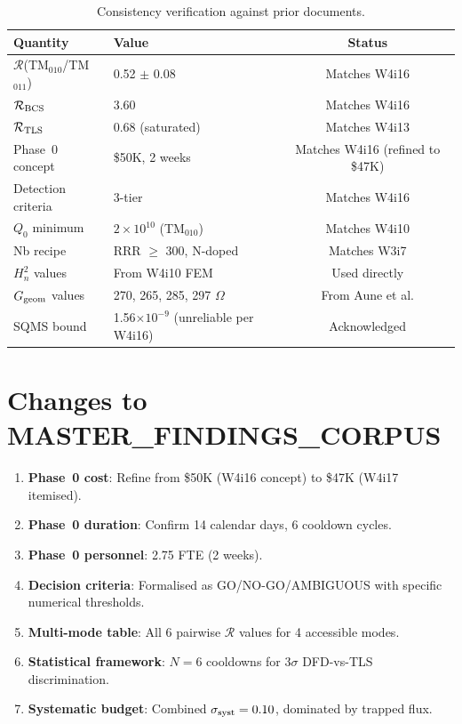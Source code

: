 \documentclass[11pt]{article}
\newcommand{\ee}[1]{\times 10^{#1}}
\newcommand{\Heff}{H_n}
\theoremstyle{definition}
\theoremstyle{remark}
\begin{document}
\begin{table}[H]
\centering
\caption{Consistency verification against prior documents.}
\label{tab:consistency}
\renewcommand{\arraystretch}{1.2}
\begin{tabular}{@{}llc@{}}
\toprule
\textbf{Quantity} & \textbf{Value} & \textbf{Status} \\
\midrule
$\mathcal{R}$(TM$_{010}$/TM$_{011}$) & 0.52 $\pm$ 0.08 & Matches W4i16 \\
$\mathcal{R}_{\rm BCS}$ & 3.60 & Matches W4i16 \\
$\mathcal{R}_{\rm TLS}$ & 0.68 (saturated) & Matches W4i13 \\
Phase~0 concept & \$50K, 2 weeks & Matches W4i16 (refined to \$47K) \\
Detection criteria & 3-tier & Matches W4i16 \\
$Q_0$ minimum & $2\ee{10}$ (TM$_{010}$) & Matches W4i10 \\
Nb recipe & RRR $\geq$ 300, N-doped & Matches W3i7 \\
$\Heff^2$ values & From W4i10 FEM & Used directly \\
$G_{\rm geom}$ values & 270, 265, 285, 297 $\Omega$ & From Aune et al. \\
SQMS bound & 1.56$\ee{-9}$ (unreliable per W4i16) & Acknowledged \\
\bottomrule
\end{tabular}
\end{table}


\section{Changes to MASTER\_FINDINGS\_CORPUS}

\begin{enumerate}
\item \textbf{Phase~0 cost}: Refine from \$50K (W4i16 concept) to
  \$47K (W4i17 itemised).
\item \textbf{Phase~0 duration}: Confirm 14 calendar days, 6 cooldown
  cycles.
\item \textbf{Phase~0 personnel}: 2.75 FTE (2 weeks).
\item \textbf{Decision criteria}: Formalised as GO/NO-GO/AMBIGUOUS
  with specific numerical thresholds.
\item \textbf{Multi-mode table}: All 6 pairwise $\mathcal{R}$ values
  for 4 accessible modes.
\item \textbf{Statistical framework}: $N = 6$ cooldowns for
  $3\sigma$ DFD-vs-TLS discrimination.
\item \textbf{Systematic budget}: Combined $\sigma_{\rm syst} = 0.10$,
  dominated by trapped flux.
\end{enumerate}
\end{document}
